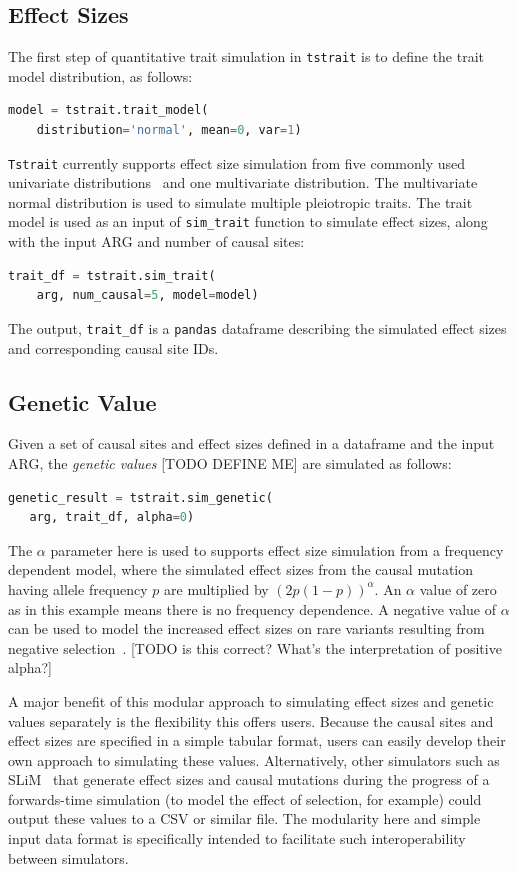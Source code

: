 \documentclass[unnumsec,webpdf,modern,large,namedate]{oup-authoring-template}%
\begin{document}
\subsection{Effect Sizes}
The first step of quantitative trait simulation in \texttt{tstrait} is to
define the trait model distribution, as follows:
\begin{lstlisting}[language=Python]
model = tstrait.trait_model(
    distribution='normal', mean=0, var=1)
\end{lstlisting}
\texttt{Tstrait} currently supports effect size simulation from five
commonly used univariate distributions~\citep{gaynor2021,haller2023}
and one multivariate distribution.
The multivariate normal distribution is used to simulate multiple
pleiotropic traits.
The trait model is used as an input of \texttt{sim\_trait} function to simulate
effect sizes, along with the input ARG and number of causal sites:
\begin{lstlisting}[language=Python]
trait_df = tstrait.sim_trait(
    arg, num_causal=5, model=model)
\end{lstlisting}
The output, \texttt{trait\_df} is a \texttt{pandas} dataframe
describing the simulated effect sizes and corresponding
causal site IDs.

\subsection{Genetic Value}
Given a set of causal sites and effect sizes defined in a dataframe
and the input ARG, the \emph{genetic values} [TODO DEFINE ME]
are simulated as follows:
\begin{lstlisting}[language=Python]
genetic_result = tstrait.sim_genetic(
   arg, trait_df, alpha=0)
\end{lstlisting}
The $\alpha$ parameter here is used to
supports effect size simulation from a frequency
dependent model, where the simulated effect sizes from the causal mutation
having allele frequency $p$ are multiplied by $\left(2p(1-p)\right)^\alpha$.
An $\alpha$ value of zero as in this example means there is
no frequency dependence. A negative value of $\alpha$
can be used to model the increased effect sizes on rare variants
resulting from negative selection~\citep{speed2017}.
[TODO is this correct? What's the interpretation of positive alpha?]

A major benefit of this modular approach to simulating effect sizes
and genetic values separately is the flexibility this offers
users. Because the causal sites and effect sizes are specified in a
simple tabular format, users can easily develop their own approach
to simulating these values. Alternatively, other simulators
such as SLiM~\citep{haller2023} that generate effect sizes and
causal mutations during the progress of a forwards-time simulation
(to model the effect of selection, for example) could output these
values to a CSV or similar file. The modularity here and simple
input data format is specifically intended to facilitate such
interoperability between simulators.
\end{document}
